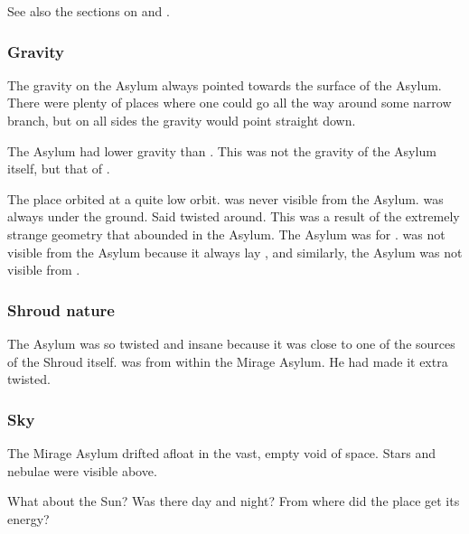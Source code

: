 See also the sections on  and . 





\subsubsection{Gravity}
The gravity on the Asylum always pointed  towards the surface of the Asylum. 
There were plenty of places where one could go all the way around some narrow branch, but on all sides the gravity would point straight down. 

The Asylum had lower gravity than \Miith. 
This was not the gravity of the Asylum itself, but that of \Miith. 

The place orbited \Miith at a quite low orbit. 
\Miith was never visible from the Asylum. 
\Miith was always  under the ground. 
Said  twisted around.
This was a result of the extremely strange geometry that abounded in the Asylum. 
The Asylum was  for \Ishnaruchaefir. 
\Miith was not visible from the Asylum because it always lay , and similarly, the Asylum was not visible from \Miith. 





\subsubsection{Shroud nature}
The Asylum was so twisted and insane because it was close to one of the sources of the Shroud itself. 
\Ishnaruchaefir was  from within the Mirage Asylum. 
He had made it extra twisted. 





\subsubsection{Sky}
The Mirage Asylum drifted afloat in the vast, empty void of space. 
Stars and nebulae were visible above. 

What about the Sun?
Was there day and night?
From where did the place get its energy?









